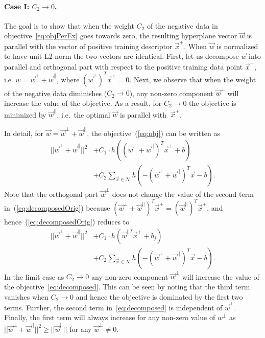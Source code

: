       \paragraph{Case I: $C_2\rightarrow 0$.}
         The goal is to show that when the weight  $C_2$ of the negative data in objective~\eqref{eq:objPerEx} goes towards zero, the resulting hyperplane vector $\vec{w}$ is parallel with the vector of positive training descriptor $\vec{x}^+$. When $\vec{w}$ is normalized to have unit L2 norm the two vectors are identical. First, let us decompose $\vec{w}$ into parallel and orthogonal part with respect to the positive training data point $\vec{x}^+$, i.e. $w = \vec{w}^{\perp} + \vec{w}^{||}$, where $(\vec{w}^{\perp})^T \vec{x}^+ = 0$. Next, we observe that when the weight of the negative data diminishes ($C_2\rightarrow 0$), any non-zero component $\vec{w}^{\perp}$ will increase the value of the objective. As a result, for $C_2\rightarrow 0$ the objective is minimized by $\vec{w}^{||}$, i.e.\ the optimal $\vec{w}$ is parallel with $\
        \vec{x}^+$.

         In detail, for $\vec{w} = \vec{w}^{\perp}+\vec{w}^{||}$, the objective~(\ref{eq:obj}) can be written as
%
            \begin{align}
              \label{eq:decomposedOrig}
                ||\vec{w}^{\perp}+\vec{w}^{||}||^{2} &+
                C_1 \cdot h
                \left(
                 (\vec{w}^{\perp}+\vec{w}^{||})^T \vec{x}^+ + b
                \right) \\ \nonumber
                &+
                C_2\sum_{\vec{x} \in \mathcal N} h
                \left(
                 -(\vec{w}^{\perp}+\vec{w}^{||})^T \vec{x} -b
                \right).
            \end{align}
%
         Note that the orthogonal part $\vec{w}^{\perp}$ does not change the value of  the second term in~(\ref{eq:decomposedOrig}) because $(\vec{w}^{\perp}+\vec{w}^{||})^T \vec{x}^+ = (\vec{w}^{||})^T \vec{x}^+$, and hence~(\ref{eq:decomposedOrig}) reduces to
            \begin{align} 
              \label{eq:decomposed} 
              ||\vec{w}^{\perp}+\vec{w}^{||}||^{2} &+
              C_1 \cdot h
              \left(
                  \vec{w}^{||T} \vec{x}^+ +b_j
              \right) \\ \nonumber
              &+
              C_2\sum_{\vec{x} \in \mathcal N} h
              \left(
                -(\vec{w}^{\perp}+\vec{w}^{||})^T \vec{x}-b
              \right).
            \end{align}
%
          In the limit case as $C_2 \rightarrow 0$ any non-zero component $\vec{w}^{\perp}$ will increase the value of the objective~\eqref{eq:decomposed}. This can be seen by noting that the third term vanishes when $C_2 \rightarrow 0$ and hence the objective is dominated by the first two terms. Further, the second term in~\eqref{eq:decomposed} is independent of $\vec{w}^{\perp}$. Finally, the first term will always increase for any non-zero value of $w^{\perp}$ as $||\vec{w}^{\perp}+\vec{w}^{||}||^{2} \geq ||\vec{w}^{||}||$ for any $\vec{w}^{\perp}\neq0$.

